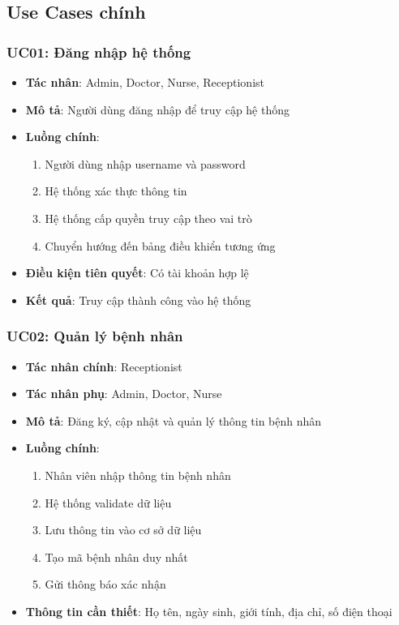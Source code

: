 \documentclass[12pt,a4paper]{report}
\begin{document}
\subsection{Use Cases chính}

\subsubsection{UC01: Đăng nhập hệ thống}
\begin{itemize}
    \item \textbf{Tác nhân}: Admin, Doctor, Nurse, Receptionist
    \item \textbf{Mô tả}: Người dùng đăng nhập để truy cập hệ thống
    \item \textbf{Luồng chính}:
    \begin{enumerate}
        \item Người dùng nhập username và password
        \item Hệ thống xác thực thông tin
        \item Hệ thống cấp quyền truy cập theo vai trò
        \item Chuyển hướng đến bảng điều khiển tương ứng
    \end{enumerate}
    \item \textbf{Điều kiện tiên quyết}: Có tài khoản hợp lệ
    \item \textbf{Kết quả}: Truy cập thành công vào hệ thống
\end{itemize}

\subsubsection{UC02: Quản lý bệnh nhân}
\begin{itemize}
    \item \textbf{Tác nhân chính}: Receptionist
    \item \textbf{Tác nhân phụ}: Admin, Doctor, Nurse
    \item \textbf{Mô tả}: Đăng ký, cập nhật và quản lý thông tin bệnh nhân
    \item \textbf{Luồng chính}:
    \begin{enumerate}
        \item Nhân viên nhập thông tin bệnh nhân
        \item Hệ thống validate dữ liệu
        \item Lưu thông tin vào cơ sở dữ liệu
        \item Tạo mã bệnh nhân duy nhất
        \item Gửi thông báo xác nhận
    \end{enumerate}
    \item \textbf{Thông tin cần thiết}: Họ tên, ngày sinh, giới tính, địa chỉ, số điện thoại
\end{itemize}
\end{document}

